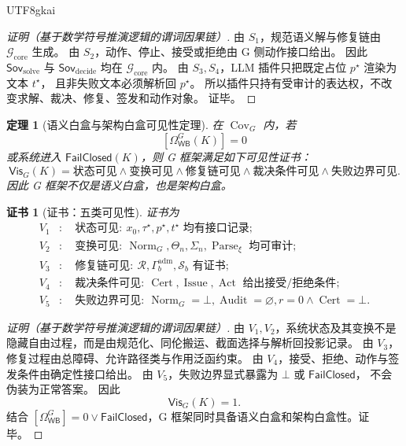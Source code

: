 \documentclass[12pt]{article}
\newtheorem{theorem}{定理}[section]
\newtheorem{Certificate}{证书}[section]
\newcommand{\FailClosed}{\mathsf{FailClosed}}
\newcommand{\WB}{\mathsf{WB}}
\newcommand{\Cert}{\operatorname{Cert}}
\newcommand{\Norm}{\operatorname{Norm}}
\newcommand{\Parse}{\operatorname{Parse}}
\newcommand{\Audit}{\operatorname{Audit}}
\newcommand{\Issue}{\operatorname{Issue}}
\newcommand{\Act}{\operatorname{Act}}
\newcommand{\Sov}{\mathsf{Sov}}
\newcommand{\Vis}{\mathsf{Vis}}
\begin{document}
\begin{CJK*}{UTF8}{gkai}
\begin{proof}[证明（基于数学符号推演逻辑的谓词因果链）]
由 \(S_1\)，规范语义解与修复链由 \(\mathcal G_{\mathrm{core}}\) 生成。
由 \(S_2\)，动作、停止、接受或拒绝由 G 侧动作接口给出。
因此 \(\Sov_{\mathrm{solve}}\) 与 \(\Sov_{\mathrm{decide}}\) 均在 \(\mathcal G_{\mathrm{core}}\) 内。
由 \(S_3,S_4\)，LLM 插件只把既定占位 \(p^\star\) 渲染为文本 \(t^\star\)，
且非失败文本必须解析回 \(p^\star\)。
所以插件只持有受审计的表达权，不改变求解、裁决、修复、签发和动作对象。
证毕。
\end{proof}

\begin{theorem}[语义白盒与架构白盒可见性定理]
\label{thm:tex51-g-visibility}
在 \(\operatorname{Cov}_G\) 内，若
\[
  [\Omega_{\WB}^{G}(K)]=0
\]
或系统进入 \(\FailClosed(K)\)，则 G 框架满足如下可见性证书：
\[
  \Vis_G(K)
  =
  \text{状态可见}
  \wedge
  \text{变换可见}
  \wedge
  \text{修复链可见}
  \wedge
  \text{裁决条件可见}
  \wedge
  \text{失败边界可见}.
\]
因此 G 框架不仅是语义白盒，也是架构白盒。
\end{theorem}

\begin{Certificate}[证书：五类可见性]
\label{cert:tex51-g-visibility}
证书为
\[
\begin{aligned}
  V_1&:\quad \text{状态可见}:\ x_0,\tau^\star,p^\star,t^\star\text{ 均有接口记录};\\
  V_2&:\quad \text{变换可见}:\ \Norm_G,\Theta_n,\Sigma_n,\Parse_\xi\text{ 均可审计};\\
  V_3&:\quad \text{修复链可见}:\ \mathcal R,\Gamma_b^{\mathrm{adm}},\mathcal S_b\text{ 有证书};\\
  V_4&:\quad \text{裁决条件可见}:\ \Cert,\Issue,\Act\text{ 给出接受/拒绝条件};\\
  V_5&:\quad \text{失败边界可见}:\ \Norm_G=\bot,\Audit=\varnothing,r=0\wedge\Cert=\bot.
\end{aligned}
\]
\end{Certificate}

\begin{proof}[证明（基于数学符号推演逻辑的谓词因果链）]
由 \(V_1,V_2\)，系统状态及其变换不是隐藏自由过程，而是由规范化、同伦搬运、截面选择与解析回投影记录。
由 \(V_3\)，修复过程由总障碍、允许路径类与作用泛函约束。
由 \(V_4\)，接受、拒绝、动作与签发条件由确定性接口给出。
由 \(V_5\)，失败边界显式暴露为 \(\bot\) 或 \(\FailClosed\)，
不会伪装为正常答案。
因此
\[
  \Vis_G(K)=1.
\]
结合 \([\Omega_{\WB}^{G}]=0\vee\FailClosed\)，G 框架同时具备语义白盒和架构白盒性。证毕。
\end{proof}


\end{CJK*}
\end{document}
